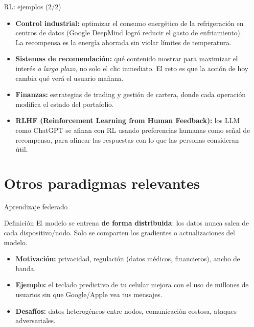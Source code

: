 \documentclass[aspectratio=169]{beamer}
\begin{document}
\begin{frame}{RL: ejemplos (2/2)}
  \small
  \begin{itemize}
    \item \textbf{Control industrial:} optimizar el consumo energético de la refrigeración en centros de datos (Google DeepMind logró reducir el gasto de enfriamiento). La recompensa es la energía ahorrada sin violar límites de temperatura.
    \item \textbf{Sistemas de recomendación:} qué contenido mostrar para maximizar el interés \textit{a largo plazo}, no solo el clic inmediato. El reto es que la acción de hoy cambia qué verá el usuario mañana.
    \item \textbf{Finanzas:} estrategias de trading y gestión de cartera, donde cada operación modifica el estado del portafolio.
    \item \textbf{RLHF (Reinforcement Learning from Human Feedback):} los LLM como ChatGPT se afinan con RL usando preferencias humanas como señal de recompensa, para alinear las respuestas con lo que las personas consideran útil.
  \end{itemize}
\end{frame}

\section{Otros paradigmas relevantes}

\begin{frame}{Aprendizaje federado}
  \begin{block}{Definición}
    El modelo se entrena \textbf{de forma distribuida}: los datos nunca salen de cada dispositivo/nodo. Solo se comparten los gradientes o actualizaciones del modelo.
  \end{block}
  \bigskip
  \begin{itemize}
    \item \textbf{Motivación:} privacidad, regulación (datos médicos, financieros), ancho de banda.
    \item \textbf{Ejemplo:} el teclado predictivo de tu celular mejora con el uso de millones de usuarios sin que Google/Apple vea tus mensajes.
    \item \textbf{Desafíos:} datos heterogéneos entre nodos, comunicación costosa, ataques adversariales.
  \end{itemize}
\end{frame}
\end{document}
